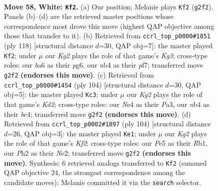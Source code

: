 \documentclass[11pt]{article}
\begin{document}
\clearpage

\begin{figure}[p]\centering
\begin{subfigure}{0.46\textwidth}\centering
\resizebox{\linewidth}{!}{%
\newchessgame
\chessboard[
  setfen={5k2/2r2p1p/b5p1/4P3/1n2NPp1/8/6KP/1B6 w - - 6 58},
  showmover=false,
  pgfstyle=straightmove, color=movearrow, markmove={g2-f2}
]}
\caption{}
\end{subfigure}\hfill
\begin{subfigure}{0.46\textwidth}\centering
\resizebox{\linewidth}{!}{%
\newchessgame
\chessboard[
  setfen={8/4kp2/4p1p1/3p2P1/3P3P/3NP1K1/8/r4B2 w - - 37 60},
  showmover=false,
  pgfstyle=straightmove, color=movearrow, markmove={g3-f2}
]}
\caption{}
\end{subfigure}
\\[4pt]
\begin{subfigure}{0.46\textwidth}\centering
\resizebox{\linewidth}{!}{%
\newchessgame
\chessboard[
  setfen={8/8/6k1/1p3p2/p1b3p1/P3P1P1/1B1K4/8 w - - 2 53},
  showmover=false,
  pgfstyle=straightmove, color=movearrow, markmove={d2-c3}
]}
\caption{}
\end{subfigure}\hfill
\begin{subfigure}{0.46\textwidth}\centering
\resizebox{\linewidth}{!}{%
\newchessgame
\chessboard[
  setfen={8/5pk1/4p3/p2pP1p1/3P4/r7/4NK2/1R6 w - - 2 53},
  showmover=false,
  pgfstyle=straightmove, color=movearrow, markmove={f2-e1}
]}
\caption{}
\end{subfigure}
\caption{\textbf{Move 58, White: \texttt{Kf2}.} (a) Our position; Melanie plays \texttt{Kf2} (\texttt{g2f2}). Panels (b)--(d) are the retrieved master positions whose correspondence most drove this move (highest QAP objective among those that transfer to it). (b) Retrieved from \texttt{ccrl\_top\_p0000\#1851} (ply 118) [structural distance $d$=30, QAP obj=7]: the master played \texttt{Kf2}; under $\mu$ our \emph{Kg2} plays the role of that game's \emph{Kg3}; cross-type roles: our \emph{b}a6 as their \emph{p}g6, our \emph{n}b4 as their \emph{p}f7; transferred move \texttt{g2f2} \textbf{(endorses this move)}. (c) Retrieved from \texttt{ccrl\_top\_p0000\#1454} (ply 104) [structural distance $d$=30, QAP obj=5]: the master played \texttt{Kc3}; under $\mu$ our \emph{Kg2} plays the role of that game's \emph{Kd2}; cross-type roles: our \emph{N}e4 as their \emph{P}a3, our \emph{n}b4 as their \emph{b}c4; transferred move \texttt{g2f2} \textbf{(endorses this move)}. (d) Retrieved from \texttt{ccrl\_top\_p0002\#1897} (ply 104) [structural distance $d$=26, QAP obj=3]: the master played \texttt{Ke1}; under $\mu$ our \emph{Kg2} plays the role of that game's \emph{Kf2}; cross-type roles: our \emph{P}e5 as their \emph{R}b1, our \emph{P}h2 as their \emph{N}e2; transferred move \texttt{g2f2} \textbf{(endorses this move)}. Synthesis: 6 retrieved analogs transferred to \texttt{Kf2} (summed QAP objective 24, the strongest correspondence among the candidate moves); Melanie committed it via the \texttt{search} selector.}
\label{fig:thought-m114}
\end{figure}
\end{document}
